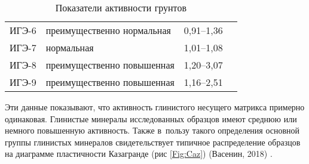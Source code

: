 \begin{table}[ht]
    \centering
    \caption{Показатели активности грунтов} \label{tab:ak}
    \begin{tabular}{clcc}
    ИГЭ-6 \dotfill &  преимущественно нормальная & 0,91--1,36 \\
    ИГЭ-7 \dotfill &  нормальная & 1,01--1,08 \\
    ИГЭ-8 \dotfill &  преимущественно повышенная & 1,20--3,07 \\
    ИГЭ-9 \dotfill &  преимущественно повышенная & 1,16--2,51\\
    \end{tabular}
\end{table}
    

Эти данные показывают, что активность глинистого несущего матрикса примерно одинаковая. Глинистые минералы исследованных образцов имеют среднюю или немного повышенную активность.
Также в~пользу такого определения основной группы глинистых минералов свидетельствует типичное распределение образцов на диаграмме пластичности Казагранде (рис \ref{Fig:Caz}) (Васенин, 2018) \cite{vasenin2018}.








